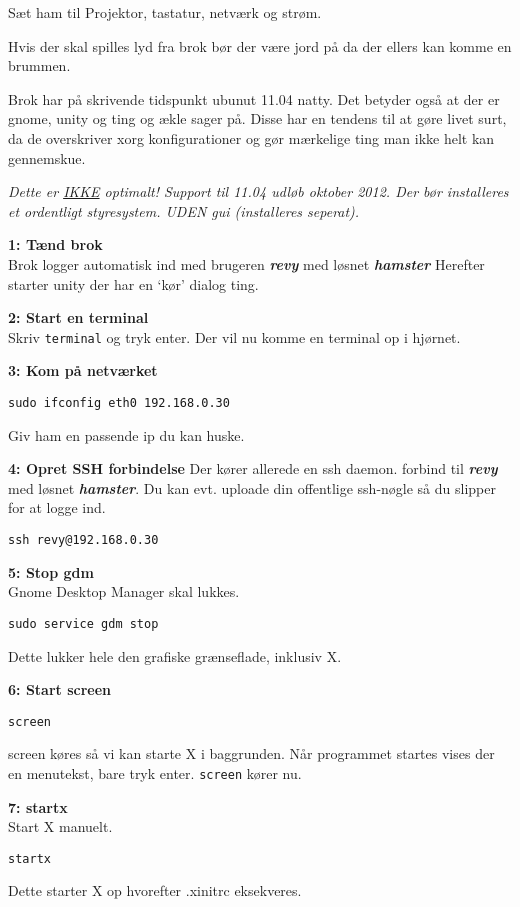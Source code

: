 \documentclass[10pt,a4paper,danish]{article}
\newcommand{\code}[1]{\colorbox{verbgray}{\texttt{#1}}}
\begin{document}
Sæt ham til
Projektor, tastatur, netværk og strøm.

Hvis der skal spilles lyd fra brok bør der være jord på da der ellers kan komme
en brummen.

Brok har på skrivende tidspunkt ubunut 11.04 natty.
Det betyder også at der er gnome, unity og ting og ækle sager på.
Disse har en tendens til at gøre livet surt, da de overskriver xorg
konfigurationer og gør mærkelige ting man ikke helt kan gennemskue.

\textit{Dette er \uline{IKKE} optimalt!
  Support til 11.04 udløb oktober 2012. Der bør installeres et ordentligt
  styresystem. UDEN gui (installeres seperat).}

\textbf{1: Tænd brok}\\
Brok logger automatisk ind med brugeren \textbf{\textit{revy}} med løsnet \textbf{\textit{hamster}}
Herefter starter unity der har en `kør' dialog ting.

\textbf{2: Start en terminal}\\
Skriv \code{terminal} og tryk enter.
Der vil nu komme en terminal op i hjørnet.

\textbf{3: Kom på netværket}\\
\begin{verbatim}
sudo ifconfig eth0 192.168.0.30
\end{verbatim}
Giv ham en passende ip du kan huske.

\textbf{4: Opret SSH forbindelse}
Der kører allerede en ssh daemon.
forbind til \textbf{\textit{revy}} med løsnet \textbf{\textit{hamster}}.
Du kan evt. uploade din offentlige ssh-nøgle så du slipper for at logge ind.
\begin{verbatim}
ssh revy@192.168.0.30
\end{verbatim}

\textbf{5: Stop gdm}\\
Gnome Desktop Manager skal lukkes.
\begin{verbatim}
sudo service gdm stop
\end{verbatim}
Dette lukker hele den grafiske grænseflade, inklusiv X.

\textbf{6: Start screen}\\
\begin{verbatim}
screen
\end{verbatim}
screen køres så vi kan starte X i baggrunden.
Når programmet startes vises der en menutekst, bare tryk enter.
\texttt{screen} kører nu.

\textbf{7: startx}\\
Start X manuelt.
\begin{verbatim}
startx
\end{verbatim}
Dette starter X op hvorefter .xinitrc eksekveres.
\end{document}
